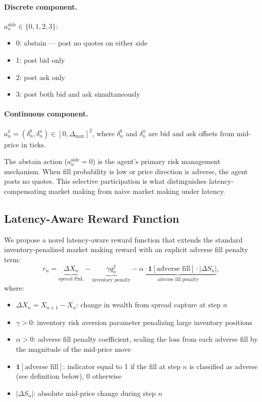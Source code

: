 \documentclass[12pt]{article}
\begin{document}
\paragraph{Discrete component.} $a^{\mathrm{side}}_n \in \{0, 1, 2, 3\}$:
\begin{itemize}[leftmargin=2em]
  \item 0: abstain --- post no quotes on either side
  \item 1: post bid only
  \item 2: post ask only
  \item 3: post both bid and ask simultaneously
\end{itemize}

\paragraph{Continuous component.} $a^{\delta}_n = (\delta^b_n, \delta^a_n) \in [0, \Delta_{\max}]^2$, where $\delta^b_n$ and $\delta^a_n$ are bid and ask offsets from mid-price in ticks.

The abstain action ($a^{\mathrm{side}}_n = 0$) is the agent's primary risk management mechanism. When fill probability is low or price direction is adverse, the agent posts no quotes. This selective participation is what distinguishes latency-compensating market making from naive market making under latency.

\subsection{Latency-Aware Reward Function}
\label{subsec:reward}

We propose a novel latency-aware reward function that extends the standard inventory-penalized market making reward with an explicit adverse fill penalty term:
\begin{equation}
  r_n = \underbrace{\Delta X_n}_{\text{spread PnL}}
      - \underbrace{\gamma q_n^2}_{\text{inventory penalty}}
      - \underbrace{\alpha \cdot \mathbf{1}[\text{adverse fill}] \cdot |\Delta S_n|}_{\text{adverse fill penalty}},
\end{equation}
where:
\begin{itemize}[leftmargin=2em]
  \item $\Delta X_n = X_{n+1} - X_n$: change in wealth from spread capture at step $n$
  \item $\gamma > 0$: inventory risk aversion parameter penalizing large inventory positions
  \item $\alpha > 0$: adverse fill penalty coefficient, scaling the loss from each adverse fill by the magnitude of the mid-price move
  \item $\mathbf{1}[\text{adverse fill}]$: indicator equal to 1 if the fill at step $n$ is classified as adverse (see definition below), 0 otherwise
  \item $|\Delta S_n|$: absolute mid-price change during step $n$
\end{itemize}
\end{document}
